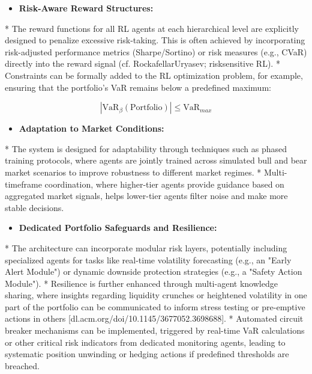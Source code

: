\documentclass[11pt]{article}
\begin{document}
\begin{itemize}
\item   \textbf{Risk-Aware Reward Structures:}
\end{itemize}
    *   The reward functions for all RL agents at each hierarchical level are explicitly designed to penalize excessive risk-taking. This is often achieved by incorporating risk-adjusted performance metrics (Sharpe/Sortino) or risk measures (e.g., CVaR) directly into the reward signal (cf. RockafellarUryasev; risksensitive RL).
    *   Constraints can be formally added to the RL optimization problem, for example, ensuring that the portfolio's VaR remains below a predefined maximum:
    
\begin{equation}
|\text{VaR}_\beta(\text{Portfolio})| \leq \text{VaR}_{max}
\end{equation}

\begin{itemize}
\item   \textbf{Adaptation to Market Conditions:}
\end{itemize}
    *   The system is designed for adaptability through techniques such as phased training protocols, where agents are jointly trained across simulated bull and bear market scenarios to improve robustness to different market regimes.
    *   Multi-timeframe coordination, where higher-tier agents provide guidance based on aggregated market signals, helps lower-tier agents filter noise and make more stable decisions.

\begin{itemize}
\item   \textbf{Dedicated Portfolio Safeguards and Resilience:}
\end{itemize}
    *   The architecture can incorporate modular risk layers, potentially including specialized agents for tasks like real-time volatility forecasting (e.g., an "Early Alert Module") or dynamic downside protection strategies (e.g., a "Safety Action Module").
    *   Resilience is further enhanced through multi-agent knowledge sharing, where insights regarding liquidity crunches or heightened volatility in one part of the portfolio can be communicated to inform stress testing or pre-emptive actions in others [dl.acm.org/doi/10.1145/3677052.3698688].
    *   Automated circuit breaker mechanisms can be implemented, triggered by real-time VaR calculations or other critical risk indicators from dedicated monitoring agents, leading to systematic position unwinding or hedging actions if predefined thresholds are breached.
\end{document}
